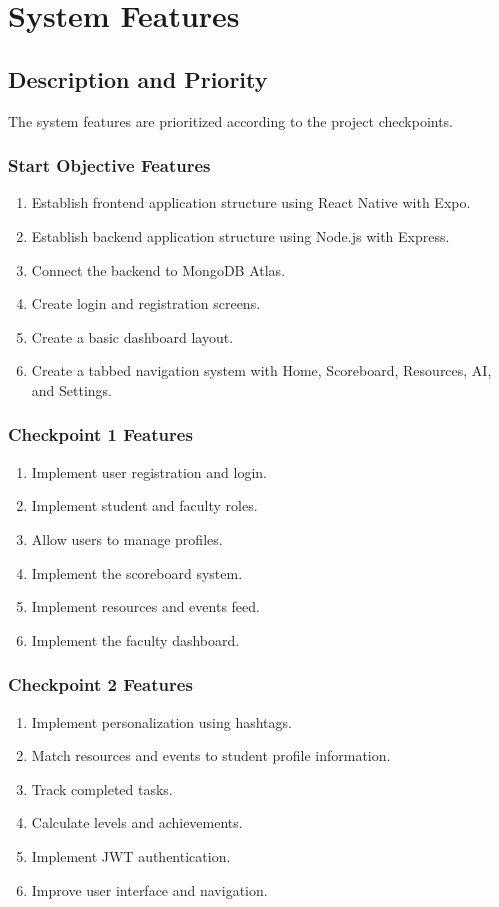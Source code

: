 \documentclass{scrreprt}
\begin{document}
\chapter{System Features}

\section{Description and Priority}
The system features are prioritized according to the project checkpoints.

\subsection{Start Objective Features}
\begin{enumerate}
    \item Establish frontend application structure using React Native with Expo.
    \item Establish backend application structure using Node.js with Express.
    \item Connect the backend to MongoDB Atlas.
    \item Create login and registration screens.
    \item Create a basic dashboard layout.
    \item Create a tabbed navigation system with Home, Scoreboard, Resources, AI, and Settings.
\end{enumerate}

\subsection{Checkpoint 1 Features}
\begin{enumerate}
    \item Implement user registration and login.
    \item Implement student and faculty roles.
    \item Allow users to manage profiles.
    \item Implement the scoreboard system.
    \item Implement resources and events feed.
    \item Implement the faculty dashboard.
\end{enumerate}

\subsection{Checkpoint 2 Features}
\begin{enumerate}
    \item Implement personalization using hashtags.
    \item Match resources and events to student profile information.
    \item Track completed tasks.
    \item Calculate levels and achievements.
    \item Implement JWT authentication.
    \item Improve user interface and navigation.
\end{enumerate}
\end{document}
